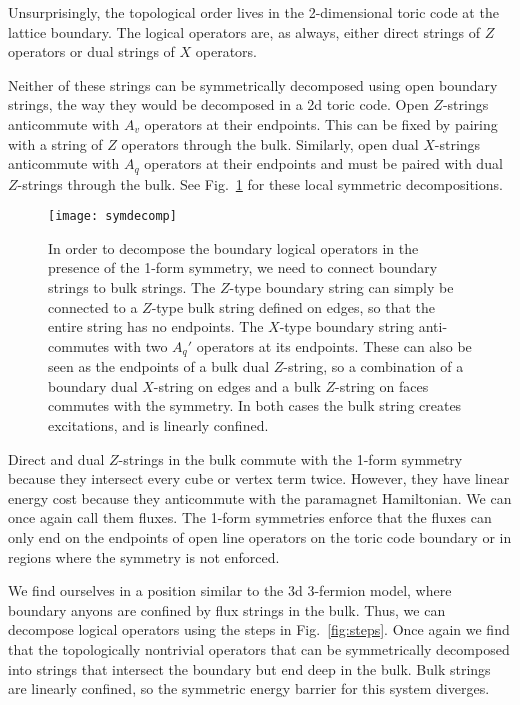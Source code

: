 Unsurprisingly, the topological order lives in the 2-dimensional toric code at the lattice boundary. The logical operators are, as always, either direct strings of $Z$ operators or dual strings of $X$ operators. 


Neither of these strings can be symmetrically decomposed using open boundary strings, the way they would be decomposed in a 2d toric code. Open $Z$-strings anticommute with $A_v$ operators at their endpoints. This can be fixed by pairing with a string of $Z$ operators through the bulk. Similarly, open dual $X$-strings anticommute with $A_q$ operators at their endpoints and must be paired with dual $Z$-strings through the bulk. See Fig.~\ref{fig:symdecomp} for these local symmetric decompositions.

\begin{figure}
\centering
\texttt{[image: symdecomp]}
\caption[Logical operator decomposition with paramagnetic bulk]{In order to decompose the boundary logical operators in the presence of the 1-form symmetry, we need to connect boundary strings to bulk strings. The $Z$-type boundary string can simply be connected to a $Z$-type bulk string defined on edges, so that the entire string has no endpoints. The $X$-type boundary string anti-commutes with two $A_q'$ operators at its endpoints. These can also be seen as the endpoints of a bulk dual $Z$-string, so a combination of a boundary dual $X$-string on edges and a bulk $Z$-string on faces commutes with the symmetry. In both cases the bulk string creates excitations, and is linearly confined.}
\label{fig:symdecomp}
\end{figure}

Direct and dual $Z$-strings in the bulk commute with the 1-form symmetry because they intersect every cube or vertex term twice. However, they have linear energy cost because they anticommute with the paramagnet Hamiltonian. We can once again call them fluxes. The 1-form symmetries enforce that the fluxes can only end on the endpoints of open line operators on the toric code boundary or in regions where the symmetry is not enforced.

We find ourselves in a position similar to the 3d 3-fermion model, where boundary anyons are confined by flux strings in the bulk. Thus, we can decompose logical operators using the steps in Fig.~\ref{fig:steps}. Once again we find that the topologically nontrivial operators that can be symmetrically decomposed into strings that intersect the boundary but end deep in the bulk. Bulk strings are linearly confined, so the symmetric energy barrier for this system diverges.

